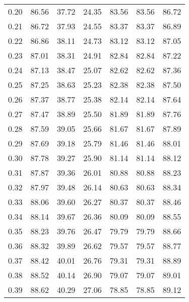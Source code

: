 \begin{tabular}{|c|c|c|c|c|c|c|}
      0.20 &     86.56 &     37.72 &      24.35 &   83.56 &      83.56 &         86.72 \\
      0.21 &     86.72 &     37.93 &      24.55 &   83.37 &      83.37 &         86.89 \\
      0.22 &     86.86 &     38.11 &      24.73 &   83.12 &      83.12 &         87.05 \\
      0.23 &     87.01 &     38.31 &      24.91 &   82.84 &      82.84 &         87.22 \\
      0.24 &     87.13 &     38.47 &      25.07 &   82.62 &      82.62 &         87.36 \\
      0.25 &     87.25 &     38.63 &      25.23 &   82.38 &      82.38 &         87.50 \\
      0.26 &     87.37 &     38.77 &      25.38 &   82.14 &      82.14 &         87.64 \\
      0.27 &     87.47 &     38.89 &      25.50 &   81.89 &      81.89 &         87.76 \\
      0.28 &     87.59 &     39.05 &      25.66 &   81.67 &      81.67 &         87.89 \\
      0.29 &     87.69 &     39.18 &      25.79 &   81.46 &      81.46 &         88.01 \\
      0.30 &     87.78 &     39.27 &      25.90 &   81.14 &      81.14 &         88.12 \\
      0.31 &     87.87 &     39.36 &      26.01 &   80.88 &      80.88 &         88.23 \\
      0.32 &     87.97 &     39.48 &      26.14 &   80.63 &      80.63 &         88.34 \\
      0.33 &     88.06 &     39.60 &      26.27 &   80.37 &      80.37 &         88.46 \\
      0.34 &     88.14 &     39.67 &      26.36 &   80.09 &      80.09 &         88.55 \\
      0.35 &     88.23 &     39.76 &      26.47 &   79.79 &      79.79 &         88.66 \\
      0.36 &     88.32 &     39.89 &      26.62 &   79.57 &      79.57 &         88.77 \\
      0.37 &     88.42 &     40.01 &      26.76 &   79.31 &      79.31 &         88.89 \\
      0.38 &     88.52 &     40.14 &      26.90 &   79.07 &      79.07 &         89.01 \\
      0.39 &     88.62 &     40.29 &      27.06 &   78.85 &      78.85 &         89.12 \\

\end{tabular}
